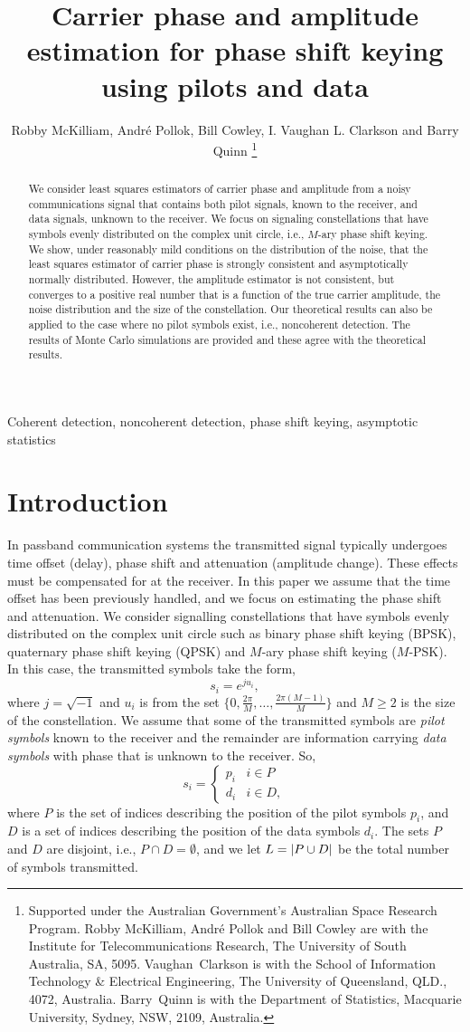 \documentclass[journal]{IEEEtran}
\title{Carrier phase and amplitude estimation for phase shift keying using pilots and data}
\author{Robby McKilliam, Andr\'{e} Pollok, Bill Cowley, I. Vaughan L. Clarkson and Barry Quinn  
\thanks{
Supported under the Australian Government’s Australian Space Research Program.
Robby McKilliam, Andr\'{e} Pollok and Bill Cowley are with the Institute for Telecommunications Research, The University of South Australia, SA, 5095.  Vaughan~Clarkson is with the School of Information Technology \& Electrical Engineering, The University of Queensland, QLD., 4072, Australia.  Barry~Quinn is with the Department of Statistics, Macquarie University, Sydney, NSW, 2109, Australia.
}}
\begin{document}
\maketitle

\begin{abstract}
We consider least squares estimators of carrier phase and amplitude from a noisy communications signal that contains both pilot signals, known to the receiver, and data signals, unknown to the receiver.  We focus on signaling constellations that have symbols evenly distributed on the complex unit circle, i.e., $M$-ary phase shift keying.  We show, under reasonably mild conditions on the distribution of the noise, that the least squares estimator of carrier phase is strongly consistent and asymptotically normally distributed.  However, the amplitude estimator is not consistent, but converges to a positive real number that is a function of the true carrier amplitude, the noise distribution and the size of the constellation.  Our theoretical results can also be applied to the case where no pilot symbols exist, i.e., noncoherent detection.  The results of Monte Carlo simulations are provided and these agree with the theoretical results.   
\end{abstract}
\begin{IEEEkeywords}
Coherent detection, noncoherent detection, phase shift keying, asymptotic statistics
\end{IEEEkeywords}

\section{Introduction}

In passband communication systems the transmitted signal typically undergoes time offset (delay), phase shift and attenuation (amplitude change).  These effects must be compensated for at the receiver. In this paper we assume that the time offset has been previously handled, and we focus on estimating the phase shift and attenuation.  We consider signalling constellations that have symbols evenly distributed on the complex unit circle such as binary phase shift keying (BPSK), quaternary phase shift keying (QPSK) and $M$-ary phase shift keying ($M$-PSK).  In this case, the transmitted symbols take the form,
\[
s_i = e^{j u_i},
\]
where $j = \sqrt{-1}$ and $u_i$ is from the set $\{0, \tfrac{2\pi}{M}, \dots, \tfrac{2\pi(M-1)}{M}\}$ and $M \geq 2$ is the size of the constellation.  We assume that some of the transmitted symbols are \emph{pilot symbols} known to the receiver and the remainder are information carrying \emph{data symbols} with phase that is unknown to the receiver.  So,
\[
s_i = \begin{cases}
p_i & i \in P \\
d_i & i \in D,
\end{cases}
\]
where $P$ is the set of indices describing the position of the pilot symbols $p_i$, and $D$ is a set of indices describing the position of the data symbols $d_i$.  The sets $P$ and $D$ are disjoint, i.e., $P \cap D = \emptyset$, and we let $L = {\left\vert P \cup D \right\vert}$ be the total number of symbols transmitted.
\end{document}

